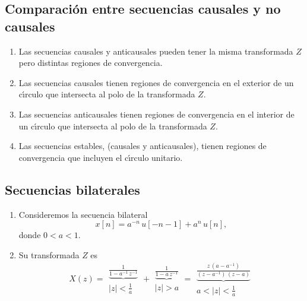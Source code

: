 \subsection{Comparaci\'{o}n entre secuencias causales y no causales}

\begin{enumerate}
\item  Las secuencias causales y anticausales pueden tener la misma
transformada $Z$ pero distintas regiones de convergencia.

\item  Las secuencias causales tienen regiones de convergencia en el
exterior de un c\'{\i}rculo que intersecta al polo de la transformada $Z.$

\item  Las secuencias anticausales tienen regiones de convergencia en el
interior de un c\'{\i}rculo que intersecta al polo de la transformada $Z.$

\item  Las secuencias estables, (causales y anticausales), tienen regiones
de convergencia que incluyen el c\'{\i}rculo unitario.
\end{enumerate}

\subsection{Secuencias bilaterales}

\begin{enumerate}

\item Consideremos la secuencia bilateral 
\begin{equation}
x\left[ n\right] =a^{-n} \, u\left[ -n-1\right] +a^{n} \, u\left[ n\right] ,
\end{equation}
donde $0<a<1.$ 

\item Su transformada $Z$ es 
\begin{equation}
X\left( z\right) = 
  \begin{array}{c}
    \underbrace{\frac{1}{1-a^{-1} \, z^{-1}}} \\ 
    \left| z\right| <\frac{1}{a}
  \end{array} + 
  \begin{array}{c}
    \underbrace{\frac{1}{1-a \, z^{-1}}} \\ 
    \left| z\right| >a
  \end{array} = 
  \begin{array}{c}
    \underbrace{\frac{z \, \left( a-a^{-1}\right) }{\left( z-a^{-1}\right) \, \left(z-a\right) }} \\ 
    a<\left| z\right| <\frac{1}{a}
  \end{array}
\end{equation}

\end{enumerate}

